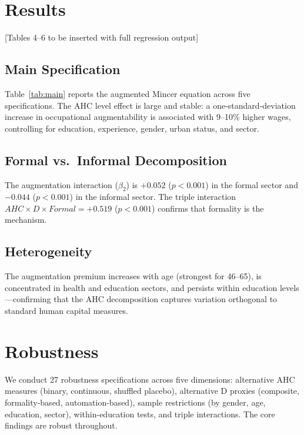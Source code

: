 \documentclass[12pt,a4paper]{article}
\begin{document}
\section{Results}
\label{sec:results}

[Tables 4--6 to be inserted with full regression output]

\subsection{Main Specification}

Table~\ref{tab:main} reports the augmented Mincer equation across five specifications. The AHC level effect is large and stable: a one-standard-deviation increase in occupational augmentability is associated with 9--10\% higher wages, controlling for education, experience, gender, urban status, and sector.

\subsection{Formal vs.\ Informal Decomposition}

The augmentation interaction ($\beta_2$) is $+0.052$ ($p < 0.001$) in the formal sector and $-0.044$ ($p < 0.001$) in the informal sector. The triple interaction $AHC \times D \times Formal = +0.519$ ($p < 0.001$) confirms that formality is the mechanism.

\subsection{Heterogeneity}

The augmentation premium increases with age (strongest for 46--65), is concentrated in health and education sectors, and persists within education levels---confirming that the AHC decomposition captures variation orthogonal to standard human capital measures.


\section{Robustness}
\label{sec:robustness}

We conduct 27 robustness specifications across five dimensions: alternative AHC measures (binary, continuous, shuffled placebo), alternative D proxies (composite, formality-based, automation-based), sample restrictions (by gender, age, education, sector), within-education tests, and triple interactions. The core findings are robust throughout.
\end{document}
